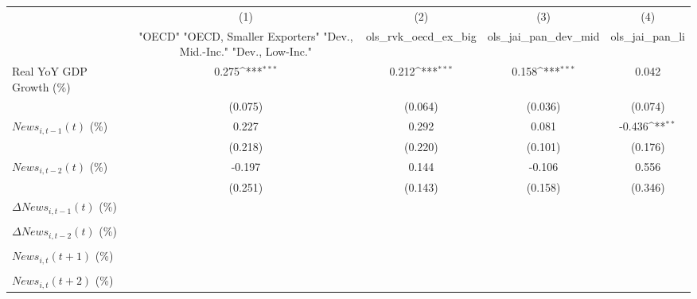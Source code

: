 {
\def\sym#1{\ifmmode^{#1}\else\(^{#1}\)\fi}
\begin{tabular}{l*{4}{c}}
\toprule
                    &\multicolumn{1}{c}{(1)}&\multicolumn{1}{c}{(2)}&\multicolumn{1}{c}{(3)}&\multicolumn{1}{c}{(4)}\\
                    &\multicolumn{1}{c}{ "OECD" "OECD, Smaller Exporters" "Dev., Mid.-Inc." "Dev., Low-Inc."}&\multicolumn{1}{c}{ols_rvk_oecd_ex_big}&\multicolumn{1}{c}{ols_jai_pan_dev_mid}&\multicolumn{1}{c}{ols_jai_pan_li}\\
\midrule
Real YoY GDP Growth (\%)&       0.275\sym{***}&       0.212\sym{***}&       0.158\sym{***}&       0.042         \\
                    &     (0.075)         &     (0.064)         &     (0.036)         &     (0.074)         \\
\addlinespace
$ News_{i,t-1}(t)$ (\%)&       0.227         &       0.292         &       0.081         &      -0.436\sym{**} \\
                    &     (0.218)         &     (0.220)         &     (0.101)         &     (0.176)         \\
\addlinespace
$ News_{i,t-2}(t)$ (\%)&      -0.197         &       0.144         &      -0.106         &       0.556         \\
                    &     (0.251)         &     (0.143)         &     (0.158)         &     (0.346)         \\
\addlinespace
$ \Delta News_{i,t-1}(t)$ (\%)&                     &                     &                     &                     \\
                    &                     &                     &                     &                     \\
\addlinespace
$ \Delta News_{i,t-2}(t)$ (\%)&                     &                     &                     &                     \\
                    &                     &                     &                     &                     \\
\addlinespace
$ News_{i,t}(t+1)$ (\%)&                     &                     &                     &                     \\
                    &                     &                     &                     &                     \\
\addlinespace
$ News_{i,t}(t+2)$ (\%)&                     &                     &                     &                     \\

\end{tabular}}
